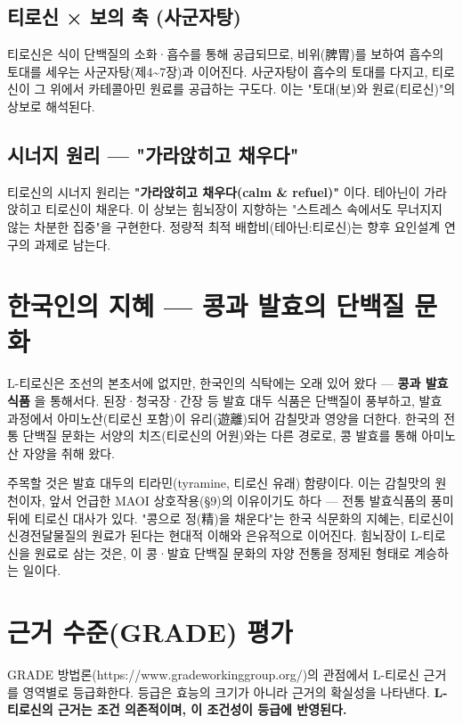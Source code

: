 \documentclass[11pt,oneside]{book}
\begin{document}
\subsection{티로신 × 보의 축 (사군자탕)}
티로신은 식이 단백질의 소화·흡수를 통해 공급되므로, 비위(脾胃)를 보하여 흡수의 토대를 세우는 사군자탕(제4\textasciitilde{}7장)과 이어진다. 사군자탕이 흡수의 토대를 다지고, 티로신이 그 위에서 카테콜아민 원료를 공급하는 구도다. 이는 "토대(보)와 원료(티로신)"의 상보로 해석된다.

\subsection{시너지 원리 — "가라앉히고 채우다"}
티로신의 시너지 원리는 \textbf{"가라앉히고 채우다(calm \& refuel)"} 이다. 테아닌이 가라앉히고 티로신이 채운다. 이 상보는 힘뇌장이 지향하는 "스트레스 속에서도 무너지지 않는 차분한 집중"을 구현한다. 정량적 최적 배합비(테아닌:티로신)는 향후 요인설계 연구의 과제로 남는다.

\section{한국인의 지혜 — 콩과 발효의 단백질 문화}
L-티로신은 조선의 본초서에 없지만, 한국인의 식탁에는 오래 있어 왔다 — \textbf{콩과 발효식품} 을 통해서다. 된장·청국장·간장 등 발효 대두 식품은 단백질이 풍부하고, 발효 과정에서 아미노산(티로신 포함)이 유리(遊離)되어 감칠맛과 영양을 더한다. 한국의 전통 단백질 문화는 서양의 치즈(티로신의 어원)와는 다른 경로로, 콩 발효를 통해 아미노산 자양을 취해 왔다.

주목할 것은 발효 대두의 티라민(tyramine, 티로신 유래) 함량이다. 이는 감칠맛의 원천이자, 앞서 언급한 MAOI 상호작용(§9)의 이유이기도 하다 — 전통 발효식품의 풍미 뒤에 티로신 대사가 있다. "콩으로 정(精)을 채운다"는 한국 식문화의 지혜는, 티로신이 신경전달물질의 원료가 된다는 현대적 이해와 은유적으로 이어진다. 힘뇌장이 L-티로신을 원료로 삼는 것은, 이 콩·발효 단백질 문화의 자양 전통을 정제된 형태로 계승하는 일이다.

\section{근거 수준(GRADE) 평가}
GRADE 방법론(https://www.gradeworkinggroup.org/)의 관점에서 L-티로신 근거를 영역별로 등급화한다. 등급은 효능의 크기가 아니라 근거의 확실성을 나타낸다. \textbf{L-티로신의 근거는 조건 의존적이며, 이 조건성이 등급에 반영된다.}
\end{document}
